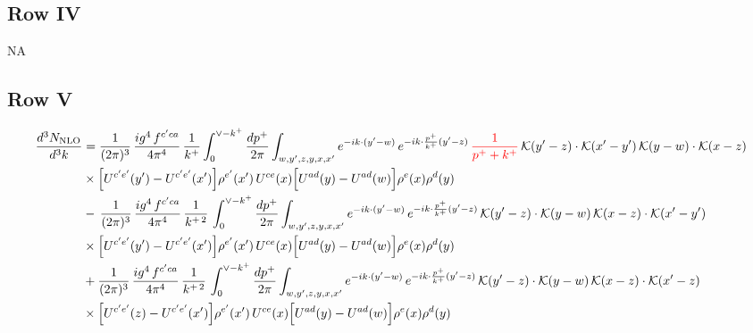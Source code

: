 \documentclass[9pt]{article}
\numberwithin{equation}{section}
\newcommand{\chg}[1]{{\color{red}#1}}
\begin{document}
\subsection{Row IV}
\textsc{NA}
\subsection{Row V}
\begin{align}
\frac{d^{3}N_{\rm NLO}}{d^{3}k} & = \frac{1}{(2\pi)^{3}}\,\frac{ig^{4}\,f^{c'ca}}{4\pi^{4}}\,\frac{1}{k^{+}}\int_{0}^{\vee-k^{+}}\frac{dp^{+}}{2\pi}\int_{w,y',z,y,x,x'}e^{-ik\cdot(y'-w)}\,e^{-ik\cdot\frac{p^{+}}{k^{+}}(y'-z)}\,\chg{\frac{1}{p^{+}+k^{+}}}\,\mathcal{K}(y'-z)\cdot\mathcal{K}(x'-y')\,\mathcal{K}(y-w)\cdot\mathcal{K}(x-z)\notag \\ & \times\Big[U^{c'e'}(y')-U^{c'e'}(x')\Big]\rho^{e'}(x')\,U^{ce}(x)\Big[U^{ad}(y)-U^{ad}(w)\Big]\rho^{e}(x)\rho^{d}(y)\notag\\
&-\,\frac{1}{(2\pi)^{3}}\,\frac{ig^{4}\,f^{c'ca}}{4\pi^{4}}\,\frac{1}{k^{+\,2}}\,\int_{0}^{\vee-k^{+}}\frac{dp^{+}}{2\pi}\int_{w,y',z,y,x,x'}e^{-ik\cdot(y'-w)}\,e^{-ik\cdot\frac{p^{+}}{k^{+}}(y'-z)}\,\mathcal{K}(y'-z)\cdot\mathcal{K}(y-w)\,\mathcal{K}(x-z)\cdot\mathcal{K}(x'-y')\notag \\ & \times\Big[U^{c'e'}(y')-U^{c'e'}(x')\Big]\rho^{e'}(x')\,U^{ce}(x)\Big[U^{ad}(y)-U^{ad}(w)\Big]\rho^{e}(x)\rho^{d}(y)\notag\\
&+\frac{1}{(2\pi)^{3}}\,\frac{ig^{4}\,f^{c'ca}}{4\pi^{4}}\,\frac{1}{k^{+\,2}}\,\int_{0}^{\vee-k^{+}}\frac{dp^{+}}{2\pi}\int_{w,y',z,y,x,x'}e^{-ik\cdot(y'-w)}\,e^{-ik\cdot\frac{p^{+}}{k^{+}}(y'-z)}\,\mathcal{K}(y'-z)\cdot\mathcal{K}(y-w)\,\mathcal{K}(x-z)\cdot\mathcal{K}(x'-z)\notag \\ & \times\Big[U^{c'e'}(z)-U^{c'e'}(x')\Big]\rho^{e'}(x')\,U^{ce}(x)\Big[U^{ad}(y)-U^{ad}(w)\Big]\rho^{e}(x)\rho^{d}(y)
\end{align}
\end{document}
